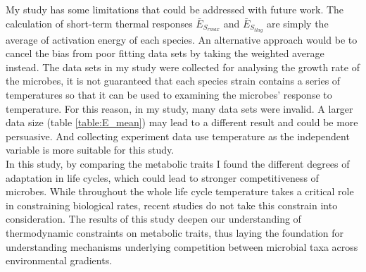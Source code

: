 \documentclass[a4paper]{article}
\begin{document}
My study has some limitations that could be addressed with future work. The calculation of short-term thermal responses $\bar{E}_{S_{rmax}}$ and $\bar{E}_{S_{tlag}}$ are simply the average of activation energy of each species. An alternative approach would be to cancel the bias from poor fitting data sets by taking the weighted average instead. The data sets in my study were collected for analysing the growth rate of the microbes, it is not guaranteed that each species strain contains a series of temperatures so that it can be used to examining the microbes' response to temperature. For this reason, in my study, many data sets were invalid. A larger data size (table \ref{table:E_mean}) may lead to a different result and could be more persuasive. And collecting experiment data use temperature as the independent variable is more suitable for this study.\\

In this study, by comparing the metabolic traits I found the different degrees of adaptation in life cycles, which could lead to stronger competitiveness of microbes. While throughout the whole life cycle temperature takes a critical role in constraining biological rates, recent studies do not take this constrain into consideration. The results of this study deepen our understanding of thermodynamic constraints on metabolic traits, thus laying the foundation for understanding mechanisms underlying competition between microbial taxa across environmental gradients. \\



\end{document}
